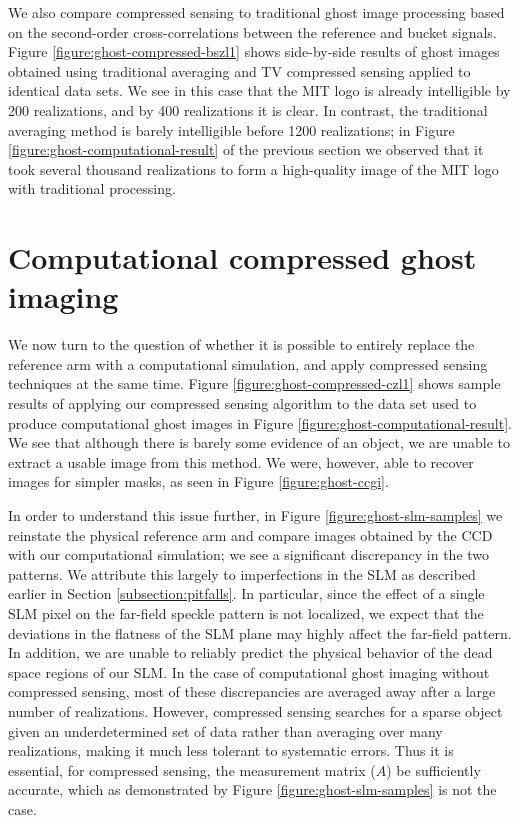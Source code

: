 We also compare compressed sensing to traditional ghost image processing based on the second-order cross-correlations between the reference and bucket signals. Figure \ref{figure:ghost-compressed-bszl1} shows side-by-side results of ghost images obtained using traditional averaging and TV compressed sensing applied to identical data sets. We see in this case that the MIT logo is already intelligible by 200 realizations, and by 400 realizations it is clear. In contrast, the traditional averaging method is barely intelligible before 1200 realizations; in Figure \ref{figure:ghost-computational-result} of the previous section we observed that it took several thousand realizations to form a high-quality image of the MIT logo with traditional processing.

\section{Computational compressed ghost imaging}
\label{section:ghost-cc}

We now turn to the question of whether it is possible to entirely replace the reference arm with a computational simulation, and apply compressed sensing techniques at the same time. Figure \ref{figure:ghost-compressed-czl1} shows sample results of applying our compressed sensing algorithm to the data set used to produce computational ghost images in Figure \ref{figure:ghost-computational-result}. We see that although there is barely some evidence of an object, we are unable to extract a usable image from this method. We were, however, able to recover images for simpler masks, as seen in Figure \ref{figure:ghost-ccgi}.

In order to understand this issue further, in Figure \ref{figure:ghost-slm-samples} we reinstate the physical reference arm and compare images obtained by the CCD with our computational simulation; we see a significant discrepancy in the two patterns. We attribute this largely to imperfections in the SLM as described earlier in Section \ref{subsection:pitfalls}. In particular, since the effect of a single SLM pixel on the far-field speckle pattern is not localized, we expect that the deviations in the flatness of the SLM plane may highly affect the far-field pattern. In addition, we are unable to reliably predict the physical behavior of the dead space regions of our SLM. In the case of computational ghost imaging without compressed sensing, most of these discrepancies are averaged away after a large number of realizations. However, compressed sensing searches for a sparse object given an underdetermined set of data rather than averaging over many realizations, making it much less tolerant to systematic errors. Thus it is essential, for compressed sensing, the measurement matrix ($A$) be sufficiently accurate, which as demonstrated by Figure \ref{figure:ghost-slm-samples} is not the case.

